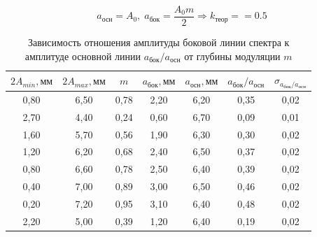 \documentclass[a4paper, 12pt]{article}
\begin{document}
$$a_\text{осн} = A_0, \; a_\text{бок}= \frac{A_0m}{2} \Rightarrow k_\text{теор} = =0.5$$
	
\begin{table}[H]
\centering
\caption{Зависимость отношения амплитуды боковой линии спектра к амплитуде основной линии $a_\text{бок}/a_\text{осн}$ от глубины модуляции $m$}
\begin{tabular}{|c|c|c|c|c|c|c|}
\hline
$2A_{min}, \text{мм}$ & $2A_{max}, \text{мм}$ & $m$  & $a_\text{бок}, \text{мм}$ & $a_\text{осн}, \text{мм}$ & $a_\text{бок}/a_\text{осн}$ & $\sigma_{a_\text{бок}/a_\text{осн}}$ \\ \hline
0,80                & 6,50                & 0,78 & 2,20                      & 6,20                      & 0,35                        & 0,02                               \\ \hline
2,70                & 4,40                & 0,24 & 0,60                      & 6,70                      & 0,09                        & 0,01                               \\ \hline
1,60                & 5,70                & 0,56 & 1,90                      & 6,30                      & 0,30                        & 0,02                               \\ \hline
1,20                & 6,20                & 0,68 & 2,40                      & 6,50                      & 0,37                        & 0,02                               \\ \hline
0,80                & 6,60                & 0,78 & 2,50                      & 6,40                      & 0,39                        & 0,02                               \\ \hline
0,40                & 7,00                & 0,89 & 3,00                      & 6,50                      & 0,46                        & 0,02                               \\ \hline
0,20                & 7,20                & 0,95 & 3,10                      & 6,40                      & 0,48                        & 0,02                               \\ \hline
2,20                & 5,00                & 0,39 & 1,20                      & 6,40                      & 0,19                        & 0,02                               \\ \hline
\end{tabular}
\end{table}
\end{document}
